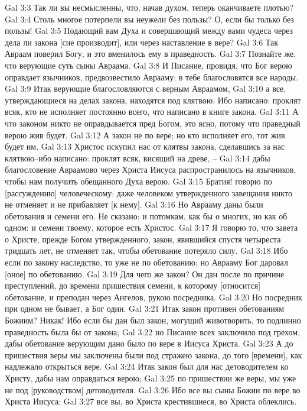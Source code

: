Gal 3:3  Так ли вы несмысленны, что, начав духом, теперь оканчиваете плотью?
Gal 3:4  Столь многое потерпели вы неужели без пользы? О, если бы только без пользы!
Gal 3:5  Подающий вам Духа и совершающий между вами чудеса через дела ли закона [сие производит], или через наставление в вере?
Gal 3:6  Так Авраам поверил Богу, и это вменилось ему в праведность.
Gal 3:7  Познайте же, что верующие суть сыны Авраама.
Gal 3:8  И Писание, провидя, что Бог верою оправдает язычников, предвозвестило Аврааму: в тебе благословятся все народы.
Gal 3:9  Итак верующие благословляются с верным Авраамом,
Gal 3:10  а все, утверждающиеся на делах закона, находятся под клятвою. Ибо написано: проклят всяк, кто не исполняет постоянно всего, что написано в книге закона.
Gal 3:11  А что законом никто не оправдывается пред Богом, это ясно, потому что праведный верою жив будет.
Gal 3:12  А закон не по вере; но кто исполняет его, тот жив будет им.
Gal 3:13  Христос искупил нас от клятвы закона, сделавшись за нас клятвою--ибо написано: проклят всяк, висящий на древе, --
Gal 3:14  дабы благословение Авраамово через Христа Иисуса распространилось на язычников, чтобы нам получить обещанного Духа верою.
Gal 3:15  Братия! говорю по [рассуждению] человеческому: даже человеком утвержденного завещания никто не отменяет и не прибавляет [к нему].
Gal 3:16  Но Аврааму даны были обетования и семени его. Не сказано: и потомкам, как бы о многих, но как об одном: и семени твоему, которое есть Христос.
Gal 3:17  Я говорю то, что завета о Христе, прежде Богом утвержденного, закон, явившийся спустя четыреста тридцать лет, не отменяет так, чтобы обетование потеряло силу.
Gal 3:18  Ибо если по закону наследство, то уже не по обетованию; но Аврааму Бог даровал [оное] по обетованию.
Gal 3:19  Для чего же закон? Он дан после по причине преступлений, до времени пришествия семени, к которому [относится] обетование, и преподан через Ангелов, рукою посредника.
Gal 3:20  Но посредник при одном не бывает, а Бог один.
Gal 3:21  Итак закон противен обетованиям Божиим? Никак! Ибо если бы дан был закон, могущий животворить, то подлинно праведность была бы от закона;
Gal 3:22  но Писание всех заключило под грехом, дабы обетование верующим дано было по вере в Иисуса Христа.
Gal 3:23  А до пришествия веры мы заключены были под стражею закона, до того [времени], как надлежало открыться вере.
Gal 3:24  Итак закон был для нас детоводителем ко Христу, дабы нам оправдаться верою;
Gal 3:25  по пришествии же веры, мы уже не под [руководством] детоводителя.
Gal 3:26  Ибо все вы сыны Божии по вере во Христа Иисуса;
Gal 3:27  все вы, во Христа крестившиеся, во Христа облеклись.
